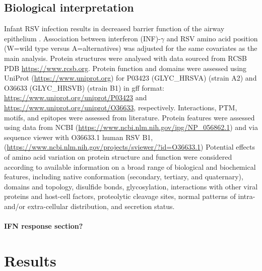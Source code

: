 \documentclass{article} %
\begin{document}
\subsection{Biological interpretation}
Infant RSV infection results in decreased barrier function of the airway epithelium
\citep{connelly2021metabolic}.
Association between interferon (INF)-$\gamma$ and RSV amino acid position (W=wild type versus A=alternatives) was adjusted for the same covariates as the main analysis.
Protein structures were analysed with data sourced from 
RCSB PDB \url{https://www.rcsb.org}.
Protein function and domains were assessed using 
UniProt	(\url{https://www.uniprot.org})
for P03423 (GLYC\_HRSVA) (strain A2) and O36633 (GLYC\_HRSVB) (strain B1) in gff format:
\url{https://www.uniprot.org/uniprot/P03423} and
\url{https://www.uniprot.org/uniprot/O36633}, respectively.
Interactions, PTM, motifs, and epitopes were assessed from literature. 
Protein features were assessed using data from NCBI
(\url{https://www.ncbi.nlm.nih.gov/ipg/NP_056862.1}) and
via sequence viewer with O36633.1 human RSV B1, 
(\url{https://www.ncbi.nlm.nih.gov/projects/sviewer/?id=O36633.1})
Potential effects of amino acid variation on protein structure and function were considered according to available information on a broad range of biological and biochemical features, including native conformation (secondary, tertiary, and quaternary), domains and topology, disulfide bonds, glycosylation, interactions with other viral proteins and host-cell factors, proteolytic cleavage sites, normal patterns of intra- and/or extra-cellular distribution, and secretion status.

\paragraph{IFN response section?}

\section{Results}
\end{document}
